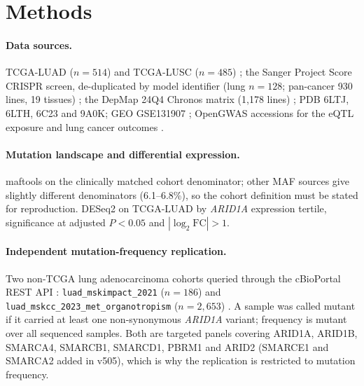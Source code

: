 \documentclass[11pt,a4paper]{article}
\newcommand{\gene}[1]{\textit{#1}}
\begin{document}
\section*{Methods}

\paragraph{Data sources.} TCGA-LUAD ($n = 514$) and TCGA-LUSC ($n = 485$)
\citep{tcgaluad2014}; the Sanger Project Score CRISPR screen, de-duplicated by
model identifier (lung $n = 128$; pan-cancer 930 lines, 19 tissues)
\citep{behan2019,pacini2021}; the DepMap 24Q4 Chronos matrix (1{,}178 lines)
\citep{depmap2025}; PDB 6LTJ, 6LTH, 6C23 and 9A0K; GEO GSE131907
\citep{kim2020}; OpenGWAS accessions for the eQTL exposure \citep{vosa2021} and
lung cancer outcomes \citep{mckay2017}.

\paragraph{Mutation landscape and differential expression.} maftools
\citep{mayakonda2018} on the clinically matched cohort denominator; other MAF
sources give slightly different denominators (6.1--6.8\%), so the cohort
definition must be stated for reproduction. DESeq2 \citep{love2014} on TCGA-LUAD
by \gene{ARID1A} expression tertile, significance at adjusted $P < 0.05$ and
$|\log_2\mathrm{FC}| > 1$.

\paragraph{Independent mutation-frequency replication.} Two non-TCGA lung
adenocarcinoma cohorts queried through the cBioPortal REST API
\citep{cerami2012,gao2013}: \texttt{luad\_mskimpact\_2021} ($n = 186$)
\citep{zehir2017} and \texttt{luad\_mskcc\_2023\_met\_organotropism}
($n = 2{,}653$) \citep{lengel2023}. A sample was called mutant if it carried at
least one non-synonymous \gene{ARID1A} variant; frequency is mutant over all
sequenced samples. Both are targeted panels covering ARID1A, ARID1B, SMARCA4,
SMARCB1, SMARCD1, PBRM1 and ARID2 (SMARCE1 and SMARCA2 added in v505), which is
why the replication is restricted to mutation frequency.
\end{document}
